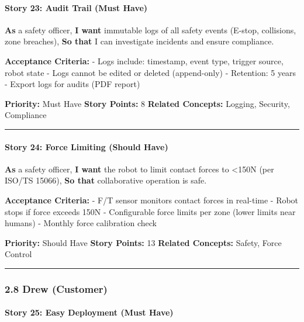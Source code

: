 \documentclass[
]{article}
\begin{document}
\hypertarget{story-23-audit-trail-must-have}{%
\paragraph{Story 23: Audit Trail (Must
Have)}\label{story-23-audit-trail-must-have}}

\textbf{As} a safety officer, \textbf{I want} immutable logs of all
safety events (E-stop, collisions, zone breaches), \textbf{So that} I
can investigate incidents and ensure compliance.

\textbf{Acceptance Criteria:} - Logs include: timestamp, event type,
trigger source, robot state - Logs cannot be edited or deleted
(append-only) - Retention: 5 years - Export logs for audits (PDF report)

\textbf{Priority:} Must Have \textbf{Story Points:} 8 \textbf{Related
Concepts:} Logging, Security, Compliance

\begin{center}\rule{0.5\linewidth}{0.5pt}\end{center}

\hypertarget{story-24-force-limiting-should-have}{%
\paragraph{Story 24: Force Limiting (Should
Have)}\label{story-24-force-limiting-should-have}}

\textbf{As} a safety officer, \textbf{I want} the robot to limit contact
forces to \textless150N (per ISO/TS 15066), \textbf{So that}
collaborative operation is safe.

\textbf{Acceptance Criteria:} - F/T sensor monitors contact forces in
real-time - Robot stops if force exceeds 150N - Configurable force
limits per zone (lower limits near humans) - Monthly force calibration
check

\textbf{Priority:} Should Have \textbf{Story Points:} 13 \textbf{Related
Concepts:} Safety, Force Control

\begin{center}\rule{0.5\linewidth}{0.5pt}\end{center}

\hypertarget{drew-customer}{%
\subsubsection{2.8 Drew (Customer)}\label{drew-customer}}

\hypertarget{story-25-easy-deployment-must-have}{%
\paragraph{Story 25: Easy Deployment (Must
Have)}\label{story-25-easy-deployment-must-have}}
\end{document}
